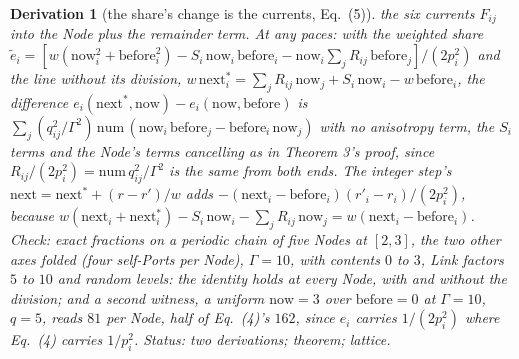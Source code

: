 \documentclass[pdflatex,sn-mathphys-num]{sn-jnl}
\newcommand{\num}{\mathrm{num}}
\theoremstyle{thmstyleone}
\newtheorem{derivation}{Derivation}
\begin{document}
\begin{derivation}[the share's change is the currents, Eq.~(5)]
the six currents $F_{ij}$ into the Node plus the remainder term. \emph{At any paces:} with the weighted share $\tilde e_i = [w(\mathrm{now}_i^2 + \mathrm{before}_i^2) - S_i\,\mathrm{now}_i\,\mathrm{before}_i - \mathrm{now}_i\sum_j R_{ij}\,\mathrm{before}_j] / (2p_i^2)$ and the line without its division, $w\,\mathrm{next}^{*}_i = \sum_j R_{ij}\,\mathrm{now}_j + S_i\,\mathrm{now}_i - w\,\mathrm{before}_i$, the difference $e_i(\mathrm{next}^{*}, \mathrm{now}) - e_i(\mathrm{now}, \mathrm{before})$ is $\sum_j (q_{ij}^2 / \Gamma^2)\,\num\,(\mathrm{now}_i\,\mathrm{before}_j - \mathrm{before}_i\,\mathrm{now}_j)$ with no anisotropy term, the $S_i$ terms and the Node's terms cancelling as in Theorem 3's proof, since $R_{ij} / (2p_i^2) = \num\,q_{ij}^2 / \Gamma^2$ is the same from both ends. The integer step's $\mathrm{next} = \mathrm{next}^{*} + (r - r') / w$ adds $-(\mathrm{next}_i - \mathrm{before}_i)(r'_i - r_i) / (2p_i^2)$, because $w(\mathrm{next}_i + \mathrm{next}^{*}_i) - S_i\,\mathrm{now}_i - \sum_j R_{ij}\,\mathrm{now}_j = w(\mathrm{next}_i - \mathrm{before}_i)$. \emph{Check:} exact fractions on a periodic chain of five Nodes at $[2, 3]$, the two other axes folded (four self-Ports per Node), $\Gamma = 10$, with contents $0$ to $3$, Link factors $5$ to $10$ and random levels: the identity holds at every Node, with and without the division; and a second witness, a uniform $\mathrm{now} = 3$ over $\mathrm{before} = 0$ at $\Gamma = 10$, $q = 5$, reads $81$ per Node, half of Eq.~(4)'s $162$, since $e_i$ carries $1 / (2p_i^2)$ where Eq.~(4) carries $1 / p_i^2$.
 \emph{Status:} two derivations; theorem; lattice.
\end{derivation}
\end{document}
